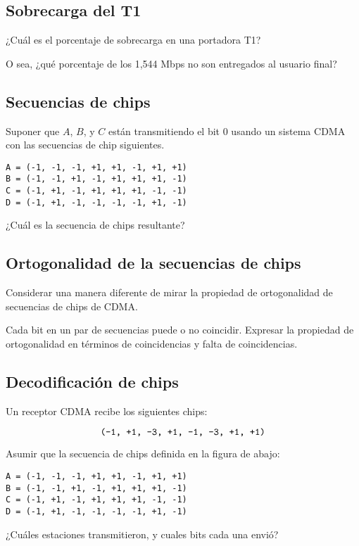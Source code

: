 \documentclass[12pt]{report}
\begin{document}
\begin{exer}
	\subsection{Sobrecarga del T1 \sthree}
	¿Cuál es el porcentaje de sobrecarga en una portadora T1?

	O sea, ¿qué porcentaje de los 1,544 Mbps no son entregados al usuario final?
\end{exer}

\begin{exer}
	\subsection{Secuencias de chips \sone}
	Suponer que $A$, $B$, y $C$ están transmitiendo el bit 0 usando un sistema CDMA con
	las secuencias de chip siguientes.\\


	\begin{verbatim}
A = (-1, -1, -1, +1, +1, -1, +1, +1)
B = (-1, -1, +1, -1, +1, +1, +1, -1)
C = (-1, +1, -1, +1, +1, +1, -1, -1)
D = (-1, +1, -1, -1, -1, -1, +1, -1)
\end{verbatim}


	¿Cuál es la secuencia de chips resultante?
\end{exer}

\begin{exer}
	\subsection{Ortogonalidad de la secuencias de chips \sone \steo}
	Considerar una manera diferente de mirar la propiedad de ortogonalidad de secuencias de chips de CDMA.

	Cada bit en un par de secuencias puede o no coincidir. Expresar la propiedad de ortogonalidad en términos de coincidencias y falta de coincidencias.
\end{exer}

\begin{exer}
	\subsection{Decodificación de chips \sthree}
	Un receptor CDMA recibe los siguientes chips:

	$$\texttt{(-1, +1, -3, +1, -1, -3, +1, +1)}$$

	Asumir que la secuencia de chips definida en la figura de abajo:\\

	\begin{verbatim}
A = (-1, -1, -1, +1, +1, -1, +1, +1)
B = (-1, -1, +1, -1, +1, +1, +1, -1)
C = (-1, +1, -1, +1, +1, +1, -1, -1)
D = (-1, +1, -1, -1, -1, -1, +1, -1)
\end{verbatim}

	¿Cuáles estaciones transmitieron, y cuales bits cada una envió?
\end{exer}
\end{document}
